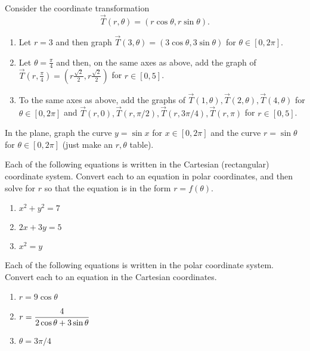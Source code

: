 \begin{problem} \label{polar coordinate transformation graph}
Consider the coordinate transformation $$\vec T(r,\theta) = (r\cos\theta,r\sin\theta).$$ 
\begin{enumerate}
\item Let $r=3$ and then graph $\vec T(3,\theta)=(3\cos\theta,3\sin\theta)$ for $\theta\in[0,2\pi]$.
\item Let $\theta=\frac{\pi}{4}$ and then, on the same axes as above, add the graph of 
$\vec T\left(r,\frac{\pi}{4}\right)=\left(r\frac{\sqrt 2}{2},r \frac{\sqrt 2}{2}\right)$ for $r\in[0,5]$.
\item To the same axes as above, add the graphs of 
$\vec T(1,\theta), \vec T(2,\theta), \vec T(4,\theta)$  for $\theta\in[0,2\pi]$ and 
$\vec T(r,0), \vec T(r,\pi/2), \vec T(r,3\pi/4), \vec T(r,\pi)$ for $r\in[0,5]$. 
\end{enumerate}
\end{problem}


\begin{problem} 
In the plane, graph the curve $y=\sin x$ for $x\in[0,2\pi]$ and the curve $r=\sin\theta$ for $\theta\in[0,2\pi]$ (just make an $r,\theta$ table). 
\end{problem}

\begin{problem}
Each of the following equations is written in the Cartesian (rectangular) coordinate system.  Convert each to an equation in polar coordinates, and then solve for $r$ so that the equation is in the form $r=f(\theta)$.
\begin{enumerate}
\item $x^2+y^2=7$
\item $2x+3y=5$
\item $x^2=y$
\end{enumerate}
\end{problem}

\begin{problem} 
Each of the following equations is written in the polar coordinate system.  Convert each to an equation in the Cartesian coordinates.
\begin{enumerate}
\item $r=9\cos\theta$
\item $\displaystyle r=\frac{4}{2\cos\theta+3\sin\theta}$
\item $\theta = 3\pi/4$
\end{enumerate}
\end{problem}

